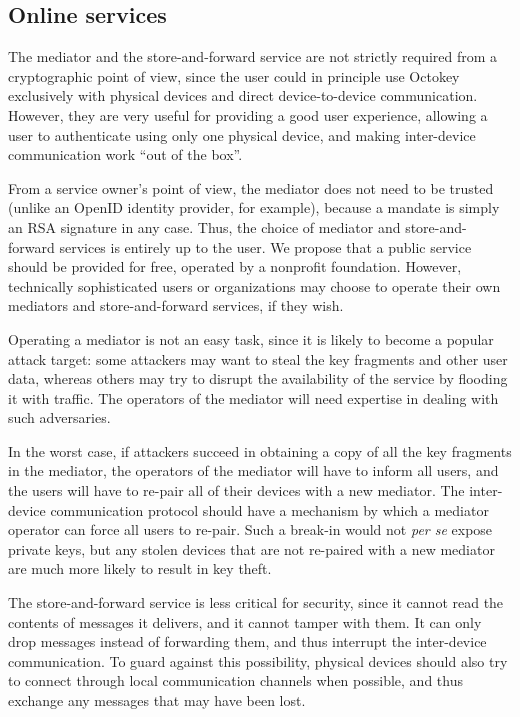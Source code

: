 \subsection{Online services}\label{sec:mediator-sec}

The mediator and the store-and-forward service are not strictly required from a cryptographic point
of view, since the user could in principle use Octokey exclusively with physical devices and direct
device-to-device communication. However, they are very useful for providing a good user experience,
allowing a user to authenticate using only one physical device, and making inter-device
communication work ``out of the box''.

From a service owner's point of view, the mediator does not need to be trusted (unlike an OpenID
identity provider, for example), because a mandate is simply an RSA signature in any case. Thus, the
choice of mediator and store-and-forward services is entirely up to the user. We propose that a
public service should be provided for free, operated by a nonprofit foundation. However, technically
sophisticated users or organizations may choose to operate their own mediators and store-and-forward
services, if they wish.

Operating a mediator is not an easy task, since it is likely to become a popular attack target: some
attackers may want to steal the key fragments and other user data, whereas others may try to disrupt
the availability of the service by flooding it with traffic. The operators of the mediator will need
expertise in dealing with such adversaries.

In the worst case, if attackers succeed in obtaining a copy of all the key fragments in the
mediator, the operators of the mediator will have to inform all users, and the users will have to
re-pair all of their devices with a new mediator. The inter-device communication protocol should
have a mechanism by which a mediator operator can force all users to re-pair. Such a break-in would
not \emph{per se} expose private keys, but any stolen devices that are not re-paired with a new
mediator are much more likely to result in key theft.

The store-and-forward service is less critical for security, since it cannot read the contents of
messages it delivers, and it cannot tamper with them. It can only drop messages instead of
forwarding them, and thus interrupt the inter-device communication. To guard against this
possibility, physical devices should also try to connect through local communication channels when
possible, and thus exchange any messages that may have been lost.

